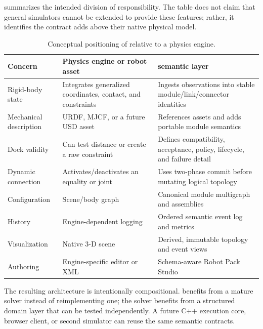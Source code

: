  summarizes the intended division of responsibility. The table
does not claim that general simulators cannot be extended to provide these features;
rather, it identifies the contract \modsim{} adds above their native physical model.

\begin{table}[htbp]
\centering
\caption{Conceptual positioning of \modsim{} relative to a physics engine.}
\label{tab:positioning}
\begin{tabularx}{\textwidth}{L{0.25\textwidth}YY}
\toprule
Concern & Physics engine or robot asset & \modsim{} semantic layer \\
\midrule
Rigid-body state & Integrates generalized coordinates, contact, and constraints &
Ingests observations into stable module/link/connector identities \\
Mechanical description & URDF, MJCF, or a future USD asset &
References assets and adds portable module semantics \\
Dock validity & Can test distance or create a raw constraint &
Defines compatibility, acceptance, policy, lifecycle, and failure detail \\
Dynamic connection & Activates/deactivates an equality or joint &
Uses two-phase commit before mutating logical topology \\
Configuration & Scene/body graph & Canonical module multigraph and assemblies \\
History & Engine-dependent logging & Ordered semantic event log and metrics \\
Visualization & Native 3-D scene & Derived, immutable topology and event views \\
Authoring & Engine-specific editor or XML & Schema-aware Robot Pack Studio \\
\bottomrule
\end{tabularx}
\end{table}

The resulting architecture is intentionally compositional. \modsim{} benefits from a
mature solver instead of reimplementing one; the solver benefits from a structured
domain layer that can be tested independently. A future C++ execution core, browser
client, or second simulator can reuse the same semantic contracts.

